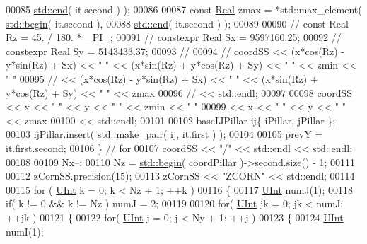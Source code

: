 \begin{DoxyCode}
00085                                              \hyperlink{namespacestd_aeb4b319cf9afda99ba1f47d32df15bc9}{std::end}( it.second ) );
00086 
00087         \textcolor{keyword}{const} \hyperlink{namespaceFVCode3D_a40c1f5588a248569d80aa5f867080e83}{Real} zmax = *std::max\_element( \hyperlink{namespacestd_acec9a198880c12f51f02be95a298a48b}{std::begin}( it.second ),
00088                                              \hyperlink{namespacestd_aeb4b319cf9afda99ba1f47d32df15bc9}{std::end}( it.second ) );
00089 
00090 \textcolor{comment}{//        const Real Rz = 45. / 180. * \_PI\_;}
00091 \textcolor{comment}{//        constexpr Real Sx = 9597160.25;}
00092 \textcolor{comment}{//        constexpr Real Sy = 5143433.37;}
00093 \textcolor{comment}{//}
00094 \textcolor{comment}{//        coordSS << (x*cos(Rz) - y*sin(Rz) + Sx) << " " << (x*sin(Rz) + y*cos(Rz) + Sy) << " " << zmin <<
       " "}
00095 \textcolor{comment}{//                << (x*cos(Rz) - y*sin(Rz) + Sx) << " " << (x*sin(Rz) + y*cos(Rz) + Sy) << " " << zmax}
00096 \textcolor{comment}{//                << std::endl;}
00097 
00098         coordSS << x << \textcolor{stringliteral}{" "} << y << \textcolor{stringliteral}{" "} << zmin << \textcolor{stringliteral}{" "}
00099                 << x << \textcolor{stringliteral}{" "} << y << \textcolor{stringliteral}{" "} << zmax
00100                 << std::endl;
00101 
00102         baseIJPillar ij\{ iPillar, jPillar \};
00103         ijPillar.insert( std::make\_pair( ij, it.first ) );
00104 
00105         prevY = it.first.second;
00106     \} \textcolor{comment}{// for}
00107     coordSS << \textcolor{stringliteral}{"/"} << std::endl << std::endl;
00108 
00109     Nx--;
00110     Nz = \hyperlink{namespacestd_acec9a198880c12f51f02be95a298a48b}{std::begin}( coordPillar )->second.size() - 1;
00111 
00112     zCornSS.precision(15);
00113     zCornSS << \textcolor{stringliteral}{"ZCORN"} << std::endl;
00114 
00115     \textcolor{keywordflow}{for} ( \hyperlink{namespaceFVCode3D_a4bf7e328c75d0fd504050d040ebe9eda}{UInt} k = 0; k < Nz + 1; ++k )
00116     \{
00117         \hyperlink{namespaceFVCode3D_a4bf7e328c75d0fd504050d040ebe9eda}{UInt} numJ(1);
00118         \textcolor{keywordflow}{if}( k != 0 && k != Nz ) numJ = 2;
00119 
00120         \textcolor{keywordflow}{for}( \hyperlink{namespaceFVCode3D_a4bf7e328c75d0fd504050d040ebe9eda}{UInt} jk = 0; jk < numJ; ++jk )
00121         \{
00122             \textcolor{keywordflow}{for}( \hyperlink{namespaceFVCode3D_a4bf7e328c75d0fd504050d040ebe9eda}{UInt} j = 0; j < Ny + 1; ++j )
00123             \{
00124                 \hyperlink{namespaceFVCode3D_a4bf7e328c75d0fd504050d040ebe9eda}{UInt} numI(1);

\end{DoxyCode}
